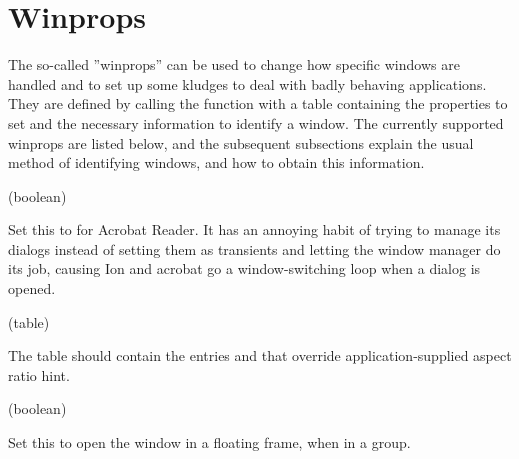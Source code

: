 \section{Winprops}
\label{sec:winprops}

The so-called ''winprops'' can be used to change how
specific windows are handled and to set up some kludges to deal with
badly behaving applications. They are defined by calling the function
 with a table containing the properties to set and the
necessary information to identify a window. The currently supported
winprops are listed below, and the subsequent subsections explain the
usual method of identifying windows, and how to obtain this information.


\newenvironment{winprop}[2]{
  \begin{function}%
      \item[Winprop:] \var{#1} (#2)
      \item[Description:]
}
{
  \end{function}
}


\begin{winprop}{acrobatic}{boolean}
    Set this to  for Acrobat Reader. It has an annoying
    habit of trying to manage its dialogs instead of setting them as
    transients and letting the window manager do its job, causing
    Ion and acrobat go a window-switching loop when a dialog is
    opened. 
\end{winprop}


\begin{winprop}{aspect}{table}
    The table should contain the entries  and  that
    override application-supplied aspect ratio hint.
\end{winprop}


\begin{winprop}{float}{boolean}
    Set this to open the window in a floating frame, when
    in a group.
\end{winprop}


